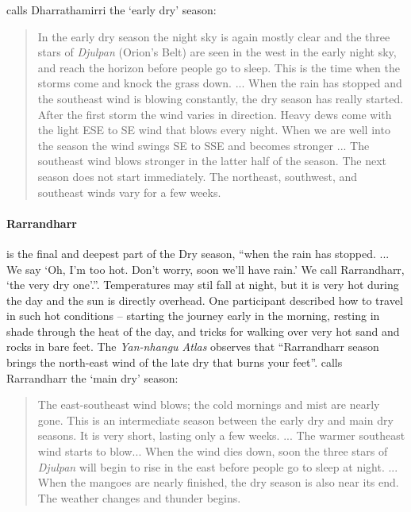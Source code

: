 \citet{davis1989} calls Dharrathamirri the `early dry' season:
\begin{quote}
    In the early dry season the night sky is again mostly clear and the three stars of
    \textit{Djulpan} (Orion's Belt) are seen in the west in the early night sky,
    and reach the horizon before people go to sleep.
    This is the time when the storms come and knock the grass down.
    ...
    When the rain has stopped and the southeast wind is blowing constantly,
    the dry season has really started.
    After the first storm the wind varies in direction.
    Heavy dews come with the light ESE to SE wind that blows every night.
    When we are well into the season the wind swings SE to SSE and becomes stronger
    ...
    The southeast wind blows stronger in the latter half of the season.
    The next season does not start immediately.
    The northeast, southwest, and southeast winds vary for a few weeks.
\end{quote}


\paragraph{Rarrandharr} is the final and deepest part of the Dry season,
``when the rain has stopped.  ... We say `Oh, I'm too hot.  Don't worry,
soon we'll have rain.'  We call Rarrandharr, `the very dry one'.''.
Temperatures may stil fall at night, but it is very hot during the day
and the sun is directly overhead.
%
One participant described how to travel in such hot conditions -- starting
the journey early in the morning, resting in shade through the heat of the
day, and tricks for walking over very hot sand and rocks in bare feet.
%
The \textit{Yan-nhangu Atlas} observes that ``Rarrandharr season brings
the north-east wind of the late dry that burns your feet''.
\citet{davis1989} calls Rarrandharr the `main dry' season:
\begin{quote}
    The east-southeast wind blows; the cold mornings and mist are nearly gone.
    This is an intermediate season between the early dry and main dry seasons.
    It is very short, lasting only a few weeks.
    ...
    The warmer southeast wind starts to blow...
    When the wind dies down, soon the three stars of \textit{Djulpan}
    will begin to rise in the east before people go to sleep at night.
    ...
    When the mangoes are nearly finished, the dry season is also near its end.
    The weather changes and thunder begins.
\end{quote}




